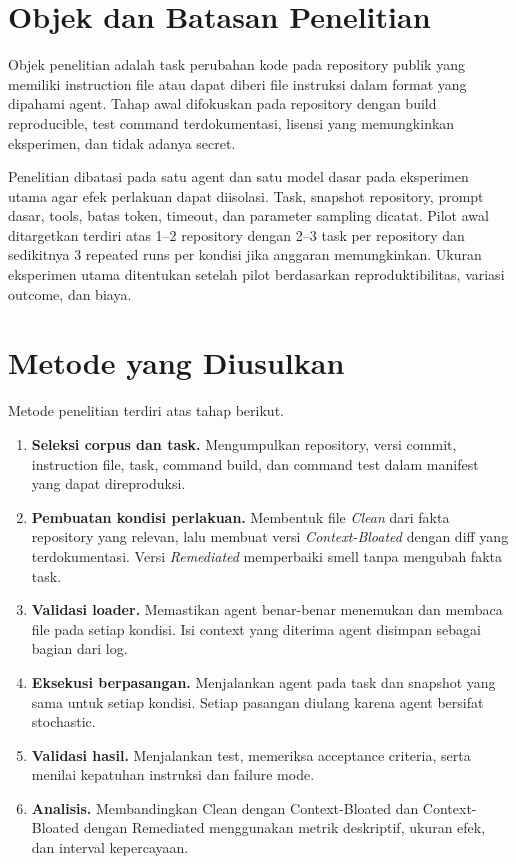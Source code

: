 \section{Objek dan Batasan Penelitian}

Objek penelitian adalah task perubahan kode pada repository publik yang memiliki instruction file atau dapat diberi file instruksi dalam format yang dipahami agent. Tahap awal difokuskan pada repository dengan build reproducible, test command terdokumentasi, lisensi yang memungkinkan eksperimen, dan tidak adanya secret.

Penelitian dibatasi pada satu agent dan satu model dasar pada eksperimen utama agar efek perlakuan dapat diisolasi. Task, snapshot repository, prompt dasar, tools, batas token, timeout, dan parameter sampling dicatat. Pilot awal ditargetkan terdiri atas 1--2 repository dengan 2--3 task per repository dan sedikitnya 3 repeated runs per kondisi jika anggaran memungkinkan. Ukuran eksperimen utama ditentukan setelah pilot berdasarkan reproduktibilitas, variasi outcome, dan biaya.

\section{Metode yang Diusulkan}

Metode penelitian terdiri atas tahap berikut.

\begin{enumerate}[leftmargin=*]
    \item \textbf{Seleksi corpus dan task.} Mengumpulkan repository, versi commit, instruction file, task, command build, dan command test dalam manifest yang dapat direproduksi.
    \item \textbf{Pembuatan kondisi perlakuan.} Membentuk file \textit{Clean} dari fakta repository yang relevan, lalu membuat versi \textit{Context-Bloated} dengan diff yang terdokumentasi. Versi \textit{Remediated} memperbaiki smell tanpa mengubah fakta task.
    \item \textbf{Validasi loader.} Memastikan agent benar-benar menemukan dan membaca file pada setiap kondisi. Isi context yang diterima agent disimpan sebagai bagian dari log.
    \item \textbf{Eksekusi berpasangan.} Menjalankan agent pada task dan snapshot yang sama untuk setiap kondisi. Setiap pasangan diulang karena agent bersifat stochastic.
    \item \textbf{Validasi hasil.} Menjalankan test, memeriksa acceptance criteria, serta menilai kepatuhan instruksi dan failure mode.
    \item \textbf{Analisis.} Membandingkan Clean dengan Context-Bloated dan Context-Bloated dengan Remediated menggunakan metrik deskriptif, ukuran efek, dan interval kepercayaan.
\end{enumerate}

